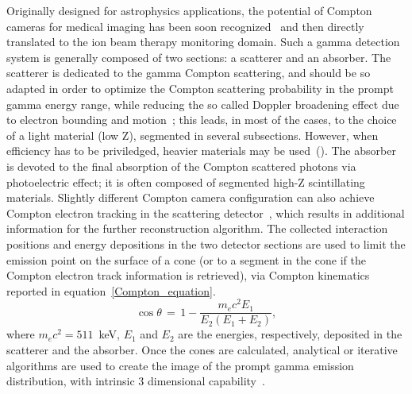 Originally designed for astrophysics applications, the potential of Compton cameras for medical imaging has been soon recognized~\cite{TODD:1974aa} and then directly translated to the ion beam therapy monitoring domain. Such a gamma detection system is generally  composed of two sections: a scatterer and an absorber. The scatterer is dedicated to the gamma Compton scattering, and should be so adapted in order to optimize the Compton scattering probability in the prompt gamma energy range, while reducing the so called Doppler broadening effect due to electron bounding and motion~\cite{Doppler}; this leads, in most of the cases, to the choice of a light material (low Z), segmented in several subsections. However, when efficiency has to be priviledged, heavier materials may be used~(\cite{Solevi:2016aa, ALDAWOOD2017190, 0031-9155-60-18-7085}). The absorber is devoted to the final absorption of the Compton scattered photons via photoelectric effect; it is often composed of segmented high-Z scintillating materials. Slightly different Compton camera configuration can also achieve Compton electron tracking in the scattering detector~\cite{Frandes_2010, Yoshihara_ETCC}, which results in additional information for the further reconstruction algorithm.
 The collected interaction positions and energy depositions in the two detector sections are used to limit the emission point on the surface of a cone (or to a segment in the cone if the Compton electron track information is retrieved), via Compton kinematics reported in equation~\ref{Compton_equation}.
\begin{equation}
\cos\theta\,=\,1-\frac{m_{e}c^{2}E_{1}}{E_{2}(E_{1}+E_{2})},
\label{Compton_equation}
\end{equation} 
where \(m_{e}c^{2} = 511\)~keV, \(E_{1}\) and \(E_{2}\) are the energies, respectively, deposited in the scatterer and the absorber. 
Once the cones are calculated, analytical or iterative algorithms are used to create the image of the prompt gamma emission distribution, with intrinsic 3 dimensional capability~\cite{McKisson3D, Kuchment:2016uiw}. 


